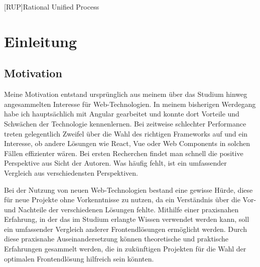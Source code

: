 \documentclass[oneside]{ausarbeitung}
\begin{document}
\lstlistoflistings

\listofabbreviations
\begin{acronym}[Bsp.]  %

[RUP]{Rational Unified Process}
\end{acronym}


\cleardoublepage
{}
\setcounter{page}{1}

\chapter{Einleitung}
\label{cha:einleitung}

\section{Motivation}
\label{sec:motivation}

Meine Motivation entstand ursprünglich aus meinem über das Studium hinweg angesammelten Interesse für Web-Technologien. In meinem bisherigen Werdegang habe ich hauptsächlich mit Angular gearbeitet und konnte dort Vorteile und Schwächen der Technologie kennenlernen. Bei zeitweise schlechter Performance treten gelegentlich Zweifel über die Wahl des richtigen Frameworks auf und ein Interesse, ob andere Lösungen wie React, Vue oder Web Components in solchen Fällen effizienter wären. Bei ersten Recherchen findet man schnell die positive Perspektive aus Sicht der Autoren. Was häufig fehlt, ist ein umfassender Vergleich aus verschiedensten Perspektiven.

Bei der Nutzung von neuen Web-Technologien bestand eine gewisse Hürde, diese für neue Projekte ohne Vorkenntnisse zu nutzen, da ein Verständnis über die Vor- und Nachteile der verschiedenen Lösungen fehlte. Mithilfe einer praxisnahen Erfahrung, in der das im Studium erlangte Wissen verwendet werden kann, soll ein umfassender Vergleich anderer Frontendlösungen ermöglicht werden. Durch diese praxisnahe Auseinandersetzung können theoretische und praktische Erfahrungen gesammelt werden, die in zukünftigen Projekten für die Wahl der optimalen Frontendlösung hilfreich sein könnten.
\end{document}
